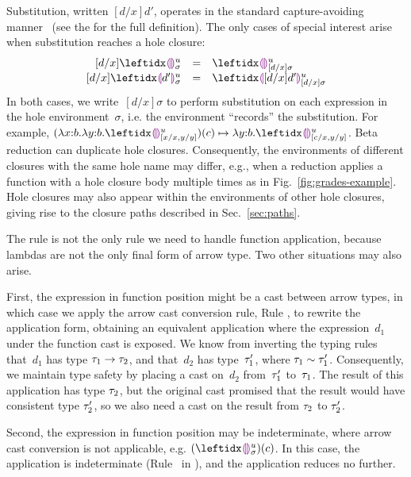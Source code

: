 


Substitution, written $[d/x]d'$, operates in the standard capture-avoiding manner~\cite{pfpl} (see the \appendixName for the full definition).
%
The only cases of special interest arise when substitution reaches a hole closure:
\[
\begin{array}{rcl}
  [d/x]\dehole{u}{\sigma}{} & = & \dehole{u}{[d/x]\sigma}{} \\%
  \substitute{d}{x}{\dhole{d'}{u}{\sigma}{}} & = & \dhole{[d/x]d'}{u}{[d/x]\sigma}{}
\end{array}
\]
In both cases, we write~$[d/x]\sigma$ to perform substitution on each expression in the hole environment~$\sigma$, i.e. the environment ``records'' the substitution.
%
For example, $\stepsToD{}
    {\hap{(\halam{x}{b}{\halam{y}{b}{\dehole{u}{[x/x, y/y]}{}}})}{c}}
    {\halam{y}{b}{\dehole{u}{[c/x, y/y]}{}}}$.
%
Beta reduction can duplicate hole closures.
%
Consequently, the environments of different closures with the same hole name may differ,
e.g., when a reduction applies a function with a hole closure body multiple times as in Fig.~\ref{fig:grades-example}.
Hole closures may also appear within the environments of other hole
closures, giving rise to the closure paths described in
Sec.~\ref{sec:paths}.



The  rule is not the only rule we need to handle function
application, because lambdas are not the only final form of arrow type.
%
Two other situations may also arise.

First, the expression in function position might be a cast between
arrow types, in which case we apply the arrow cast conversion rule,
Rule , to rewrite the application form, obtaining an
equivalent application where the expression~$d_1$ under the function
cast is exposed.
%
We know from inverting the typing rules that~$d_1$ has type
$\tau_1 \rightarrow \tau_2$, and that~$d_2$ has type~$\tau_1'$, where
$\tau_1 \sim \tau_1'$.
Consequently, we maintain type
safety by placing a cast on~$d_2$ from~$\tau_1'$ to~$\tau_1$.
%
The result of this application has type $\tau_2$, but the
original cast promised that the result would have consistent type
$\tau_2'$, so we also need a cast on the result from $\tau_2$ to
$\tau_2'$.

Second, the expression in function position may be indeterminate,
where arrow cast conversion is not applicable,
e.g. $\hap{(\dehole{u}{\sigma}{})}{c}$.
%
In this case, the application is indeterminate (Rule~
in ), and the application reduces no
further.

